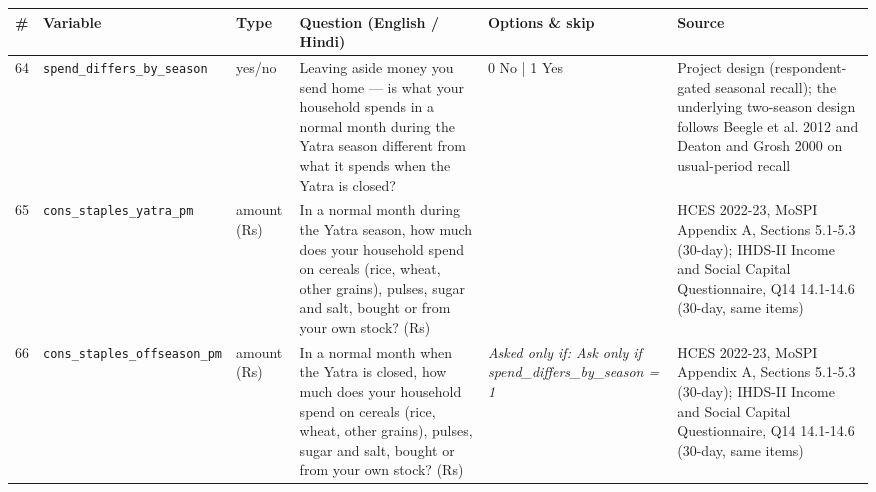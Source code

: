 \documentclass[9pt,a4paper,landscape]{article}
\begin{document}
\begin{longtable}{@{}p{0.5cm}p{3.3cm}p{1.7cm}p{7.3cm}p{5.6cm}p{5.4cm}@{}}
\toprule \footnotesize\textbf{\#} & \footnotesize\textbf{Variable} & \footnotesize\textbf{Type} & \footnotesize\textbf{Question (English / Hindi)} & \footnotesize\textbf{Options {\&} skip} & \footnotesize\textbf{Source}\\ \midrule
\endhead
\footnotesize 64 & \footnotesize\texttt{spend\_differs\_by\_season} & \scriptsize yes/no & \footnotesize Leaving aside money you send home — is what your household spends in a normal month during the Yatra season different from what it spends when the Yatra is closed?\par\vspace{1pt}{\footnotesize\color{hdr}{\hifont घर भेजे जाने वाले पैसे को छोड़कर — यात्रा के मौसम में आपके घर का महीने का ख़र्च, और जब यात्रा बंद रहती है तब का ख़र्च, क्या अलग-अलग होता है?}} & \scriptsize 0 No | 1 Yes & \scriptsize Project design (respondent-gated seasonal recall); the underlying two-season design follows Beegle et al. 2012 and Deaton and Grosh 2000 on usual-period recall\\
\footnotesize 65 & \footnotesize\texttt{cons\_staples\_yatra\_pm} & \scriptsize amount (Rs) & \footnotesize In a normal month during the Yatra season, how much does your household spend on cereals (rice, wheat, other grains), pulses, sugar and salt, bought or from your own stock? (Rs)\par\vspace{1pt}{\footnotesize\color{hdr}{\hifont यात्रा के मौसम के आम महीने में, आप (और जो यहाँ आपके साथ रहते हैं) अनाज (चावल, गेहूँ, दूसरा अनाज), दाल, चीनी और नमक पर, ख़रीदा हुआ या अपने घर का कितना ख़र्च करते हैं? (रुपये)}} & \scriptsize  & \scriptsize HCES 2022-23, MoSPI Appendix A, Sections 5.1-5.3 (30-day); IHDS-II Income and Social Capital Questionnaire, Q14 14.1-14.6 (30-day, same items)\\
\footnotesize 66 & \footnotesize\texttt{cons\_staples\_offseason\_pm} & \scriptsize amount (Rs) & \footnotesize In a normal month when the Yatra is closed, how much does your household spend on cereals (rice, wheat, other grains), pulses, sugar and salt, bought or from your own stock? (Rs)\par\vspace{1pt}{\footnotesize\color{hdr}{\hifont जब यात्रा बंद रहती है, उस आम महीने में आपका घर अनाज (चावल, गेहूँ, दूसरा अनाज), दाल, चीनी और नमक पर, ख़रीदा हुआ या अपने घर का कितना ख़र्च करता है? (रुपये)}} & \scriptsize \textit{Asked only if: Ask only if spend\_differs\_by\_season = 1} & \scriptsize HCES 2022-23, MoSPI Appendix A, Sections 5.1-5.3 (30-day); IHDS-II Income and Social Capital Questionnaire, Q14 14.1-14.6 (30-day, same items)\\

\end{longtable}
\end{document}
